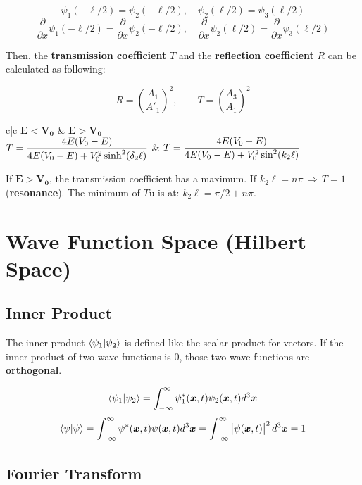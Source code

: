 \documentclass{article}
\begin{document}
\begin{twocolumn}
$$\psi_1(-\ell/2) = \psi_2(-\ell/2), \quad \psi_2(\ell/2) = \psi_3(\ell/2)$$
$$\frac{\partial}{\partial x}\psi_1(-\ell/2) = \frac{\partial}{\partial x}\psi_2(-\ell/2), \quad \frac{\partial}{\partial x}\psi_2(\ell/2) = \frac{\partial}{\partial x}\psi_3(\ell/2)$$

Then, the \textbf{transmission coefficient} $T$ and the \textbf{reflection coefficient} $R$ can be calculated as following:

$$R = \left(\frac{A_1}{A'_1}\right)^2, \qquad T = \left(\frac{A_3}{A_1}\right)^2$$

\begin{center}
\begin{mtabular}{c|c}
	$\mathbf{E < V_0}$ & $\mathbf{E > V_0}$ \\
	$\displaystyle T = \frac{4E (V_0 - E)}{4 E (V_0 - E) + V_0^2 \sinh^2 ( \delta_2 \ell )}$ &
	$\displaystyle T = \frac{4E (V_0 - E)}{4 E (V_0 - E) + V_0^2 \sin^2 ( k_2 \ell )}$ \\
\end{mtabular}
\end{center}

If $\mathbf{E > V_0}$, the transmission coefficient has a maximum. If $k_2 \ell = n \pi \, \Rightarrow \, T = 1$ (\textbf{resonance}). The minimum of $T$u is at: $k_2 \ell = \pi/2 + n\pi$.

\end{twocolumn}

\section{Wave Function Space (Hilbert Space)}

\subsection{Inner Product}

The inner product $\braket{\psi_1 | \psi_2}$ is defined like the scalar product for vectors. If the inner product of two wave functions is 0, those two wave functions are \textbf{orthogonal}.

$$\braket{\psi_1 | \psi_2} = \int_{-\infty}^{\infty} \psi_1^\ast(\bm{x},t) \psi_2(\bm{x},t) d^3 \bm{x}$$
$$\braket{\psi | \psi} = \int_{-\infty}^{\infty} \psi^\ast(\bm{x},t) \psi(\bm{x},t) d^3 \bm{x} = \int_{-\infty}^{\infty} \left| \psi(\bm{x},t) \right|^2 d^3 \bm{x} = 1$$


\subsection{Fourier Transform}
\end{document}
